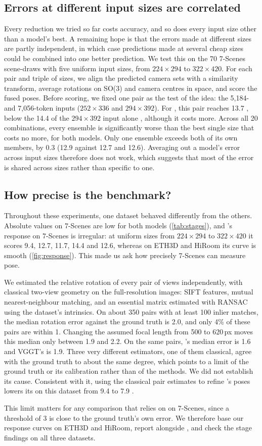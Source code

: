 \subsection{Errors at different input sizes are correlated}
\label{sec:ensemble}

Every reduction we tried so far costs accuracy, and so does every input size other than a model's best. A remaining hope is that the errors made at different sizes are partly independent, in which case predictions made at several cheap sizes could be combined into one better prediction. We test this on the 70 7-Scenes scene-draws with five uniform input sizes, from $224{\times}294$ to $322{\times}420$. For each pair and triple of sizes, we align the predicted camera sets with a similarity transform, average rotations on SO(3) and camera centres in space, and score the fused poses. Before scoring, we fixed one pair as the test of the idea: the 5{,}184- and 7{,}056-token inputs ($252{\times}336$ and $294{\times}392$). For \pithree, this pair reaches 13.7 \auc, below the 14.4 of the $294{\times}392$ input alone , although it costs more. Across all 20 combinations, every ensemble is significantly worse than the best single size that costs no more, for both models. Only one \pithree ensemble exceeds both of its own members, by 0.3 \auc (12.9 against 12.7 and 12.6). Averaging out a model's error across input sizes therefore does not work, which suggests that most of the error is shared across sizes rather than specific to one.

\subsection{How precise is the benchmark?}
\label{sec:floor}

Throughout these experiments, one dataset behaved differently from the others. Absolute \auc values on 7-Scenes are low for both models (\cref{tab:stages}), and \pithree's response on 7-Scenes is irregular: at uniform sizes from $224{\times}294$ to $322{\times}420$ it scores 9.4, 12.7, 11.7, 14.4 and 12.6, whereas on ETH3D and HiRoom its curve is smooth (\cref{fig:response}). This made us ask how precisely 7-Scenes can measure pose.

We estimated the relative rotation of every pair of views independently, with classical two-view geometry on the full-resolution images: SIFT features, mutual nearest-neighbour matching, and an essential matrix estimated with RANSAC using the dataset's intrinsics. On about 350 pairs with at least 100 inlier matches, the median rotation error against the ground truth is 2.0\textdegree, and only 4\% of these pairs are within 1\textdegree. Changing the assumed focal length from 500 to 620\,px moves this median only between 1.9\textdegree{} and 2.2\textdegree. On the same pairs, \pithree's median error is 1.6\textdegree{} and VGGT's is 1.9\textdegree. Three very different estimators, one of them classical, agree with the ground truth to about the same degree, which points to a limit of the ground truth or its calibration rather than of the methods. We did not establish its cause. Consistent with it, using the classical pair estimates to refine \pithree's poses lowers its \auc on this dataset from 9.4 to 7.9 .

This limit matters for any comparison that relies on \auc on 7-Scenes, since a threshold of 3\textdegree{} is close to the ground truth's own error. We therefore base our response curves on ETH3D and HiRoom, report \aucc alongside \auc, and check the stage findings on all three datasets.
